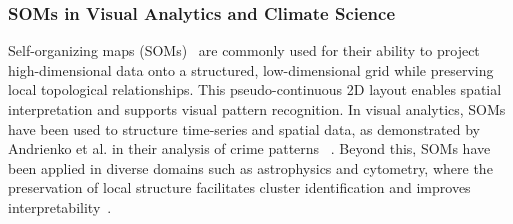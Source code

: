 



\subsubsection{SOMs in Visual Analytics and Climate Science}
Self-organizing maps (SOMs)~\cite{kohonen_self-organizing_1990} are commonly used for their ability to project high-dimensional data onto a structured, low-dimensional grid while preserving local topological relationships. This pseudo-continuous 2D layout enables spatial interpretation and supports visual pattern recognition.
In visual analytics, SOMs have been used to structure time-series and spatial data, as demonstrated by Andrienko et al. in their analysis of crime patterns ~\cite{andrienko_space-time_2010}. 
Beyond this, SOMs have been applied in diverse domains such as astrophysics and cytometry, where the preservation of local structure facilitates cluster identification and improves interpretability~\cite{chen_self-organizing_2013, hemmati_bringing_2019, sacha_somflow_2018, chushig-muzo_data-driven_2020, van_gassen_flowsom_2015,quintelier_analyzing_2021, tu_phrasemap_2024, eirich_irvine_2022}.

